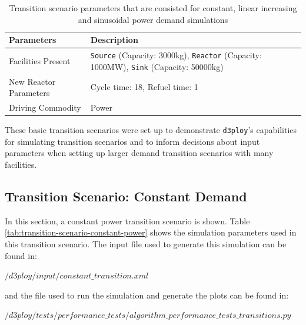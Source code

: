 \documentclass[11pt,letterpaper]{article}
\newcommand{\deploy}{\texttt{d3ploy}\xspace}%
\begin{document}
\begin{table}[!htb]
    \centering
    \caption {Transition scenario parameters that are consisted for constant, linear increasing and sinusoidal power demand simulations}
	\label{tab:transition-scenario-all}
    \begin{tabular}{|l|p{5.2cm}|}
    \hline
    \textbf{Parameters}    & \textbf{Description} \\ \hline
    Facilities Present     & \texttt{Source} (Capacity: 3000kg), \texttt{Reactor} (Capacity: 1000MW), \texttt{Sink} (Capacity: 50000kg)      \\ \hline
    New Reactor Parameters & Cycle time: 18, Refuel time: 1\\ \hline
    Driving Commodity & Power \\ \hline
    \end{tabular}
\end{table}

These basic transition scenarios were set up to 
demonstrate \deploy's capabilities for simulating 
transition scenarios and 
to inform decisions about input parameters when setting up larger 
demand transition scenarios with many facilities. 

\subsection{Transition Scenario: Constant Demand}

In this section, a constant power transition scenario is shown. 
Table \ref{tab:transition-scenario-constant-power} shows the 
simulation parameters used in this transition scenario.  
The input file used to generate this simulation can be found in:

\noindent
$/d3ploy/input/constant\_transition.xml$

\noindent
and the file used to run the simulation and generate the plots can be found in:

\noindent
$/d3ploy/tests/performance\_tests/algorithm\_performance\_tests\_transitions.py$
\end{document}
